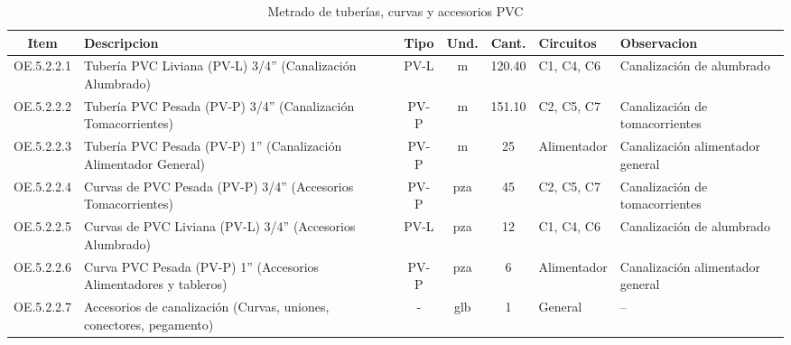 \begin{table}[H]
\centering
\small
\setlength{\tabcolsep}{5pt}
\caption{Metrado de tuberías, curvas y accesorios PVC}
\label{tab:metrado-tuberias}
\begin{tabularx}{\textwidth}{c L{4.5cm} c c c L{2.5cm} Y}
\toprule
\textbf{Item} & \textbf{Descripcion} & \textbf{Tipo} & \textbf{Und.} & \textbf{Cant.} & \textbf{Circuitos} & \textbf{Observacion} \\
\midrule
OE.5.2.2.1 & Tubería PVC Liviana (PV-L) 3/4'' (Canalización Alumbrado) & PV-L & m & 120.40 & C1, C4, C6 & Canalización de alumbrado \\
OE.5.2.2.2 & Tubería PVC Pesada (PV-P) 3/4'' (Canalización Tomacorrientes) & PV-P & m & 151.10 & C2, C5, C7 & Canalización de tomacorrientes \\
OE.5.2.2.3 & Tubería PVC Pesada (PV-P) 1'' (Canalización Alimentador General) & PV-P & m & 25 & Alimentador & Canalización alimentador general \\
OE.5.2.2.4 & Curvas de PVC Pesada (PV-P) 3/4'' (Accesorios Tomacorrientes) & PV-P & pza & 45 & C2, C5, C7 & Canalización de tomacorrientes \\
OE.5.2.2.5 & Curvas de PVC Liviana (PV-L) 3/4'' (Accesorios Alumbrado) & PV-L & pza & 12 & C1, C4, C6 & Canalización de alumbrado \\
OE.5.2.2.6 & Curva PVC Pesada (PV-P) 1'' (Accesorios Alimentadores y tableros) & PV-P & pza & 6 & Alimentador & Canalización alimentador general \\
OE.5.2.2.7 & Accesorios de canalización (Curvas, uniones, conectores, pegamento) & - & glb & 1 & General & -- \\
\bottomrule
\end{tabularx}
\end{table}
